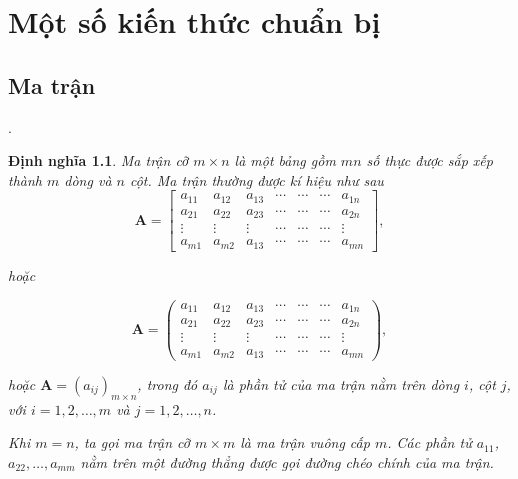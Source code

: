 \documentclass[14pt,oneside,a4paper]{report}
\newtheorem{dn}{Định nghĩa}[section]
\numberwithin{equation}{section}
\begin{document}
\chapter{Một số kiến thức chuẩn bị}
\section{Ma trận}.
\begin{dn}\cite{hieu2019}                    %
	Ma trận cỡ $m \times n$ là một bảng gồm $m n$ số thực được sắp xếp thành $m$ dòng và $n$ cột. Ma trận thường được kí hiệu như sau\\
	$$
	\mathbf{A}=\left[\begin{array}{ccccccc}
		a_{11} & a_{12} & a_{13} & \cdots & \cdots & \cdots & a_{1 n} \\
		a_{21} & a_{22} & a_{23} & \cdots & \cdots & \cdots & a_{2 n} \\
		\vdots & \vdots & \vdots & \cdots & \cdots & \cdots & \vdots \\
		a_{m 1} & a_{m 2} & a_{13} & \cdots & \cdots & \cdots & a_{m n}
	\end{array}\right],
	$$
	
	hoặc
	
	$$
	\mathbf{A}=\left(\begin{array}{ccccccc}
		a_{11} & a_{12} & a_{13} & \cdots & \cdots & \cdots & a_{1 n} \\
		a_{21} & a_{22} & a_{23} & \cdots & \cdots & \cdots & a_{2 n} \\
		\vdots & \vdots & \vdots & \cdots & \cdots & \cdots & \vdots \\
		a_{m 1} & a_{m 2} & a_{13} & \cdots & \cdots & \cdots & a_{m n}
	\end{array}\right),
	$$
	
	hoặc $\mathbf{A}=\left(a_{i j}\right)_{m \times n}$, trong đó $a_{i j}$ là phần tử của ma trận nằm trên dòng $i$, cột $j$, với $i=1,2, \ldots, m$ và $j=1,2, \ldots, n$.
	
	Khi $m=n$, ta gọi ma trận cỡ $m \times m$ là ma trận vuông cấp $m$. Các phần tử $a_{11}$, $a_{22}, \ldots, a_{m m}$ nằm trên một đường thẳng được gọi đường chéo chính của ma trận.
\end{dn}
\end{document}
